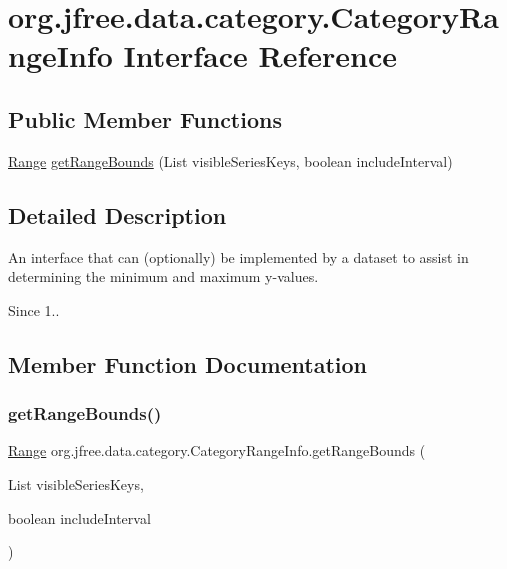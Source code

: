 \hypertarget{interfaceorg_1_1jfree_1_1data_1_1category_1_1_category_range_info}{}\section{org.\+jfree.\+data.\+category.\+Category\+Range\+Info Interface Reference}
\label{interfaceorg_1_1jfree_1_1data_1_1category_1_1_category_range_info}
\subsection*{Public Member Functions}
\begin{DoxyCompactItemize}
\item 
\mbox{\hyperlink{classorg_1_1jfree_1_1data_1_1_range}{Range}} \mbox{\hyperlink{interfaceorg_1_1jfree_1_1data_1_1category_1_1_category_range_info_a1f41f93368386a6106c59f83d6d18960}{get\+Range\+Bounds}} (List visible\+Series\+Keys, boolean include\+Interval)
\end{DoxyCompactItemize}


\subsection{Detailed Description}
An interface that can (optionally) be implemented by a dataset to assist in determining the minimum and maximum y-\/values.

\begin{DoxySince}{Since}
1.. 
\end{DoxySince}


\subsection{Member Function Documentation}
\mbox{\label{interfaceorg_1_1jfree_1_1data_1_1category_1_1_category_range_info_a1f41f93368386a6106c59f83d6d18960}} 
\subsubsection{\texorpdfstring{get\+Range\+Bounds()}{getRangeBounds()}}
{\footnotesize\ttfamily \mbox{\hyperlink{classorg_1_1jfree_1_1data_1_1_range}{Range}} org.\+jfree.\+data.\+category.\+Category\+Range\+Info.\+get\+Range\+Bounds (\begin{DoxyParamCaption}\item[{List}]{visible\+Series\+Keys,  }\item[{boolean}]{include\+Interval }\end{DoxyParamCaption})}

